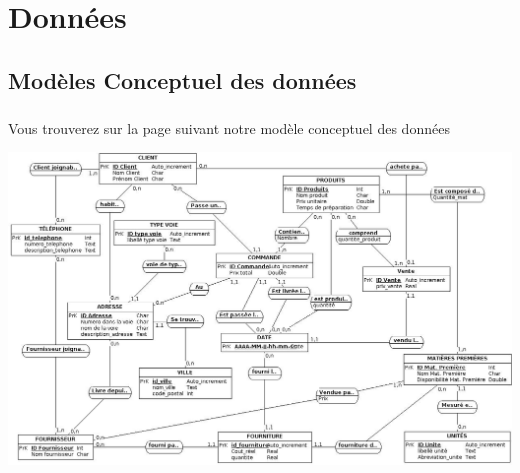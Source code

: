 \chapter{Données}

\section{Modèles Conceptuel des données}
\paragraph{}
    Vous trouverez sur la page suivant notre modèle conceptuel des données
    
\pagebreak
\includegraphics[width=\textheight, angle=270]{images/mcd.png}
